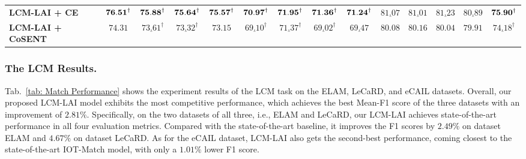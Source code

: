 \begin{table*}[t]
{\begin{tabular}{lccccccccccccc}
\midrule
 \bf{LCM-LAI + CE}          
            & $\bf{76.51}^{\dagger} $ & $\bf{75.88}^{\dagger} $ & $\bf{75.64}^{\dagger} $ & $\bf{75.57}^{\dagger} $    
            & $\bf{70.97}^{\dagger} $ & $\bf{71.95}^{\dagger} $ & $\bf{71.36}^{\dagger} $ & $\bf{71.24}^{\dagger} $    
            & $\underline{81.07} $ & $\underline{81.01} $ & $\underline{81.23} $ & $\underline{80.89}$      & $\bf 75.90^{\dagger}$\\
 \bf{LCM-LAI + CoSENT}      
 & $ 74.31 $ & $\underline{73.61}^{\dagger} $ & $\underline{73.32}^{\dagger} $ & $ 73.15 $    
 & $\underline{69.10}^{\dagger} $ & $\underline{71.37}^{\dagger} $ & $\underline{69.02}^{\dagger} $ & $\underline{69.47}$ 
 & $ 80.08 $ & $ 80.16 $ & $ 80.04 $ & $ 79.91 $ & $\underline{74.18}^{\dagger}$\\

 \bottomrule
\end{tabular}%
}
\end{table*}
\subsubsection{The LCM Results.}
Tab.~\ref{tab: Match Performance} shows the experiment results of the LCM task on the ELAM, LeCaRD, and eCAIL datasets. 
Overall, our proposed LCM-LAI model exhibits the most competitive performance, which achieves the best Mean-F1 score of the three datasets with an improvement of $2.81\%$. 
Specifically, on the two datasets of all three, i.e., ELAM and LeCaRD, our LCM-LAI achieves state-of-the-art performance in all four evaluation metrics.
Compared with the state-of-the-art baseline, it improves the F1 scores by $2.49\%$ on dataset ELAM and $4.67\%$ on dataset LeCaRD.
As for the eCAIL dataset, LCM-LAI also gets the second-best performance, coming closest to the state-of-the-art IOT-Match model, with only a $1.01\%$ lower F1 score.

